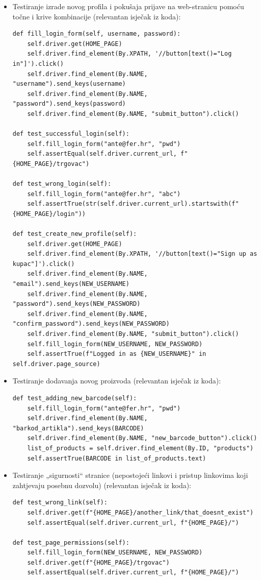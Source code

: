 			\begin{itemize}
				\item Testiranje izrade novog profila i pokušaja prijave na web-stranicu pomoću točne i krive kombinacije (relevantan isječak iz koda):
				\lstset{language=Python, tabsize=4, showstringspaces=false, basicstyle=\small}
				\begin{lstlisting}[breaklines]
def fill_login_form(self, username, password):
    self.driver.get(HOME_PAGE)
    self.driver.find_element(By.XPATH, '//button[text()="Log in"]').click()
    self.driver.find_element(By.NAME, "username").send_keys(username)
    self.driver.find_element(By.NAME, "password").send_keys(password)
    self.driver.find_element(By.NAME, "submit_button").click()
					
def test_successful_login(self):
    self.fill_login_form("ante@fer.hr", "pwd")
    self.assertEqual(self.driver.current_url, f"{HOME_PAGE}/trgovac")
					
def test_wrong_login(self):
    self.fill_login_form("ante@fer.hr", "abc")
    self.assertTrue(str(self.driver.current_url).startswith(f"{HOME_PAGE}/login"))
					
def test_create_new_profile(self):
    self.driver.get(HOME_PAGE)
    self.driver.find_element(By.XPATH, '//button[text()="Sign up as kupac"]').click()
    self.driver.find_element(By.NAME, "email").send_keys(NEW_USERNAME)
    self.driver.find_element(By.NAME, "password").send_keys(NEW_PASSWORD)
    self.driver.find_element(By.NAME, "confirm_password").send_keys(NEW_PASSWORD)
    self.driver.find_element(By.NAME, "submit_button").click()
    self.fill_login_form(NEW_USERNAME, NEW_PASSWORD)
    self.assertTrue(f"Logged in as {NEW_USERNAME}" in self.driver.page_source)	
				\end{lstlisting}
				\item Testiranje dodavanja novog proizvoda (relevantan isječak iz koda):
				\begin{lstlisting}[breaklines]
def test_adding_new_barcode(self):
	self.fill_login_form("ante@fer.hr", "pwd")
	self.driver.find_element(By.NAME, "barkod_artikla").send_keys(BARCODE)
	self.driver.find_element(By.NAME, "new_barcode_button").click()
	list_of_products = self.driver.find_element(By.ID, "products")
	self.assertTrue(BARCODE in list_of_products.text)
				\end{lstlisting}
				\item Testiranje „sigurnosti“ stranice (nepostojeći linkovi i pristup linkovima koji zahtjevaju posebnu dozvolu) (relevantan isječak iz koda):
				\begin{lstlisting}[breaklines]
def test_wrong_link(self):
	self.driver.get(f"{HOME_PAGE}/another_link/that_doesnt_exist")
	self.assertEqual(self.driver.current_url, f"{HOME_PAGE}/")

def test_page_permissions(self):
	self.fill_login_form(NEW_USERNAME, NEW_PASSWORD)
	self.driver.get(f"{HOME_PAGE}/trgovac")
	self.assertEqual(self.driver.current_url, f"{HOME_PAGE}/")
				\end{lstlisting}
			\end{itemize}
		
